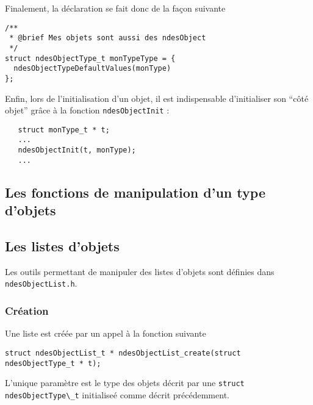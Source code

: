    Finalement, la déclaration se fait donc de la façon suivante
   
\begin{verbatim}
/**
 * @brief Mes objets sont aussi des ndesObject
 */
struct ndesObjectType_t monTypeType = {
  ndesObjectTypeDefaultValues(monType)
};
\end{verbatim}

   Enfin, lors de l'initialisation d'un objet, il est indispensable
d'initialiser son ``côté objet'' grâce à la fonction
\lstinline!ndesObjectInit! :

\begin{verbatim}
   struct monType_t * t;
   ...
   ndesObjectInit(t, monType);
   ...
\end{verbatim}

%
\subsection{Les fonctions de manipulation d'un type d'objets}

%
\subsection{Les listes d'objets}

   Les outils permettant de manipuler des listes d'objets sont
définies dans {\tt ndesObjectList.h}.

%
\subsubsection{Création}

   Une liste est créée par un appel à la fonction suivante

\begin{verbatim}
struct ndesObjectList_t * ndesObjectList_create(struct ndesObjectType_t * t);
\end{verbatim}

   L'unique paramètre est le type des objets décrit par une
\lstinline{struct ndesObjectType\_t} initialiseé comme décrit
précédemment.

